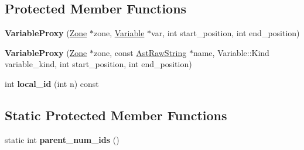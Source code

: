 \subsection*{Protected Member Functions}
\begin{DoxyCompactItemize}
\item 
{\bfseries Variable\+Proxy} (\hyperlink{classv8_1_1internal_1_1_zone}{Zone} $\ast$zone, \hyperlink{classv8_1_1internal_1_1_variable}{Variable} $\ast$var, int start\+\_\+position, int end\+\_\+position)\hypertarget{classv8_1_1internal_1_1_variable_proxy_ac14f8a8c4a8bf2d4f08ac0fe0aa6ecf7}{}\label{classv8_1_1internal_1_1_variable_proxy_ac14f8a8c4a8bf2d4f08ac0fe0aa6ecf7}

\item 
{\bfseries Variable\+Proxy} (\hyperlink{classv8_1_1internal_1_1_zone}{Zone} $\ast$zone, const \hyperlink{classv8_1_1internal_1_1_ast_raw_string}{Ast\+Raw\+String} $\ast$name, Variable\+::\+Kind variable\+\_\+kind, int start\+\_\+position, int end\+\_\+position)\hypertarget{classv8_1_1internal_1_1_variable_proxy_a06916800ebf28dca91efd3d8baf303db}{}\label{classv8_1_1internal_1_1_variable_proxy_a06916800ebf28dca91efd3d8baf303db}

\item 
int {\bfseries local\+\_\+id} (int n) const \hypertarget{classv8_1_1internal_1_1_variable_proxy_aa82da01b6891d3c74c2c9da978201668}{}\label{classv8_1_1internal_1_1_variable_proxy_aa82da01b6891d3c74c2c9da978201668}

\end{DoxyCompactItemize}
\subsection*{Static Protected Member Functions}
\begin{DoxyCompactItemize}
\item 
static int {\bfseries parent\+\_\+num\+\_\+ids} ()\hypertarget{classv8_1_1internal_1_1_variable_proxy_a29d9c4690c6988ec25dd901fe0028d1d}{}\label{classv8_1_1internal_1_1_variable_proxy_a29d9c4690c6988ec25dd901fe0028d1d}

\end{DoxyCompactItemize}
